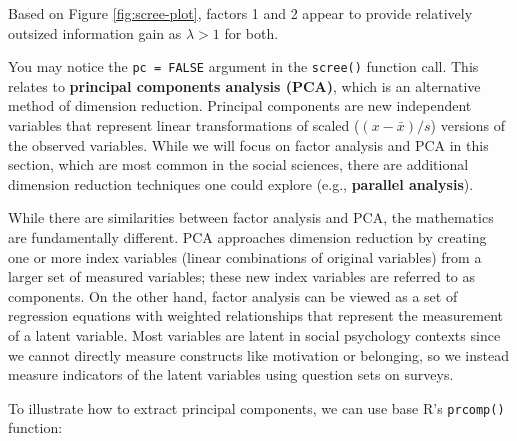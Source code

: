 \documentclass[
]{book}
\begin{document}
Based on Figure \ref{fig:scree-plot}, factors 1 and 2 appear to provide relatively outsized information gain as \(\lambda > 1\) for both.

You may notice the \texttt{pc\ =\ FALSE} argument in the \texttt{scree()} function call. This relates to \textbf{principal components analysis (PCA)}, which is an alternative method of dimension reduction. Principal components are new independent variables that represent linear transformations of scaled (\((x - \bar{x}) / s\)) versions of the observed variables. While we will focus on factor analysis and PCA in this section, which are most common in the social sciences, there are additional dimension reduction techniques one could explore (e.g., \textbf{parallel analysis}).

While there are similarities between factor analysis and PCA, the mathematics are fundamentally different. PCA approaches dimension reduction by creating one or more index variables (linear combinations of original variables) from a larger set of measured variables; these new index variables are referred to as components. On the other hand, factor analysis can be viewed as a set of regression equations with weighted relationships that represent the measurement of a latent variable. Most variables are latent in social psychology contexts since we cannot directly measure constructs like motivation or belonging, so we instead measure indicators of the latent variables using question sets on surveys.

To illustrate how to extract principal components, we can use base R's \texttt{prcomp()} function:
\end{document}
